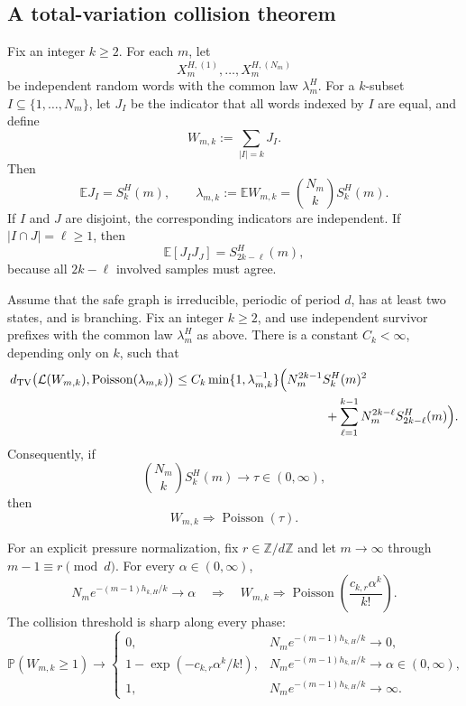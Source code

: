 \subsection{A total-variation collision theorem}

Fix an integer \(k\geq2\).  For each \(m\), let
\[
  X_m^{H,(1)},\ldots,X_m^{H,(N_m)}
\]
be independent random words with the common law \(\lambda_m^H\).  For a
\(k\)-subset \(I\subseteq\{1,\ldots,N_m\}\), let \(J_I\) be the
indicator that all words indexed by \(I\) are equal, and define
\[
  W_{m,k}:=\sum_{\lvert I\rvert=k}J_I.
\]
Then
\[
  \mathbb E J_I=S_k^H(m),
  \qquad
  \lambda_{m,k}:=\mathbb E W_{m,k}
  =\binom{N_m}{k}S_k^H(m).
\]
If \(I\) and \(J\) are disjoint, the corresponding indicators are
independent.  If \(\lvert I\cap J\rvert=\ell\geq1\), then
\begin{equation}
  \mathbb E[J_IJ_J]=S_{2k-\ell}^H(m),
  \label{eq:joint-collision-moment}
\end{equation}
because all \(2k-\ell\) involved samples must agree.

\begin{theorem}
\label{thm:periodic-collisions}
Assume that the safe graph is irreducible, periodic of period \(d\),
has at least two states, and is branching.  Fix an integer \(k\geq2\),
and use independent survivor prefixes with the common law
\(\lambda_m^H\) as above.  There is a
constant \(C_k<\infty\), depending only on \(k\), such that
\begin{align}
 d_{\rm TV}\bigl(\mathcal L(W_{m,k}),
     \operatorname{Poisson}(\lambda_{m,k})\bigr)
 &\leq C_k\min\{1,\lambda_{m,k}^{-1}\}
 \Bigl(
   N_m^{2k-1}S_k^H(m)^2 \notag\\
 &\hspace{42mm}+
   \sum_{\ell=1}^{k-1}
     N_m^{2k-\ell}S_{2k-\ell}^H(m)
 \Bigr).
 \label{eq:collision-tv-bound}
\end{align}
Consequently, if
\[
  \binom{N_m}{k}S_k^H(m)\longrightarrow\tau\in(0,\infty),
\]
then
\[
  W_{m,k}\Rightarrow\operatorname{Poisson}(\tau).
\]

For an explicit pressure normalization, fix
\(r\in\mathbb Z/d\mathbb Z\) and let \(m\to\infty\) through
\(m-1\equiv r\pmod d\).  For every \(\alpha\in(0,\infty)\),
\begin{equation}
  N_m e^{-(m-1)h_{k,H}/k}\longrightarrow\alpha
  \quad\Longrightarrow\quad
  W_{m,k}\Rightarrow
  \operatorname{Poisson}\!\left(
    \frac{c_{k,r}\alpha^k}{k!}\right).
  \label{eq:phase-poisson-limit}
\end{equation}
The collision threshold is sharp along every phase:
\begin{equation}
  \mathbb P(W_{m,k}\geq1)\longrightarrow
  \begin{cases}
    0,
      &N_m e^{-(m-1)h_{k,H}/k}\longrightarrow0,\\[2pt]
    1-\exp(-c_{k,r}\alpha^k/k!),
      &N_m e^{-(m-1)h_{k,H}/k}\longrightarrow\alpha\in(0,\infty),\\[2pt]
    1,
      &N_m e^{-(m-1)h_{k,H}/k}\longrightarrow\infty.
  \end{cases}
  \label{eq:phase-threshold}
\end{equation}
\end{theorem}

